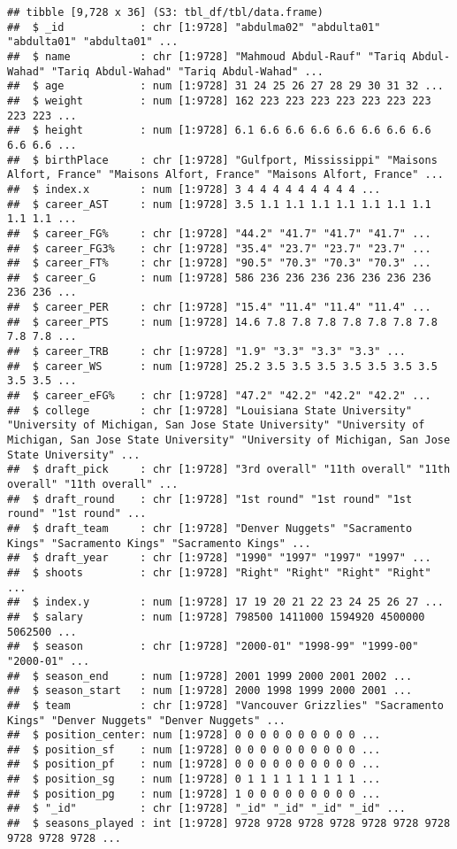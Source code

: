 \documentclass[
]{book}
\begin{document}
\begin{verbatim}
## tibble [9,728 x 36] (S3: tbl_df/tbl/data.frame)
##  $ _id            : chr [1:9728] "abdulma02" "abdulta01" "abdulta01" "abdulta01" ...
##  $ name           : chr [1:9728] "Mahmoud Abdul-Rauf" "Tariq Abdul-Wahad" "Tariq Abdul-Wahad" "Tariq Abdul-Wahad" ...
##  $ age            : num [1:9728] 31 24 25 26 27 28 29 30 31 32 ...
##  $ weight         : num [1:9728] 162 223 223 223 223 223 223 223 223 223 ...
##  $ height         : num [1:9728] 6.1 6.6 6.6 6.6 6.6 6.6 6.6 6.6 6.6 6.6 ...
##  $ birthPlace     : chr [1:9728] "Gulfport, Mississippi" "Maisons Alfort, France" "Maisons Alfort, France" "Maisons Alfort, France" ...
##  $ index.x        : num [1:9728] 3 4 4 4 4 4 4 4 4 4 ...
##  $ career_AST     : num [1:9728] 3.5 1.1 1.1 1.1 1.1 1.1 1.1 1.1 1.1 1.1 ...
##  $ career_FG%     : chr [1:9728] "44.2" "41.7" "41.7" "41.7" ...
##  $ career_FG3%    : chr [1:9728] "35.4" "23.7" "23.7" "23.7" ...
##  $ career_FT%     : chr [1:9728] "90.5" "70.3" "70.3" "70.3" ...
##  $ career_G       : num [1:9728] 586 236 236 236 236 236 236 236 236 236 ...
##  $ career_PER     : chr [1:9728] "15.4" "11.4" "11.4" "11.4" ...
##  $ career_PTS     : num [1:9728] 14.6 7.8 7.8 7.8 7.8 7.8 7.8 7.8 7.8 7.8 ...
##  $ career_TRB     : chr [1:9728] "1.9" "3.3" "3.3" "3.3" ...
##  $ career_WS      : num [1:9728] 25.2 3.5 3.5 3.5 3.5 3.5 3.5 3.5 3.5 3.5 ...
##  $ career_eFG%    : chr [1:9728] "47.2" "42.2" "42.2" "42.2" ...
##  $ college        : chr [1:9728] "Louisiana State University" "University of Michigan, San Jose State University" "University of Michigan, San Jose State University" "University of Michigan, San Jose State University" ...
##  $ draft_pick     : chr [1:9728] "3rd overall" "11th overall" "11th overall" "11th overall" ...
##  $ draft_round    : chr [1:9728] "1st round" "1st round" "1st round" "1st round" ...
##  $ draft_team     : chr [1:9728] "Denver Nuggets" "Sacramento Kings" "Sacramento Kings" "Sacramento Kings" ...
##  $ draft_year     : chr [1:9728] "1990" "1997" "1997" "1997" ...
##  $ shoots         : chr [1:9728] "Right" "Right" "Right" "Right" ...
##  $ index.y        : num [1:9728] 17 19 20 21 22 23 24 25 26 27 ...
##  $ salary         : num [1:9728] 798500 1411000 1594920 4500000 5062500 ...
##  $ season         : chr [1:9728] "2000-01" "1998-99" "1999-00" "2000-01" ...
##  $ season_end     : num [1:9728] 2001 1999 2000 2001 2002 ...
##  $ season_start   : num [1:9728] 2000 1998 1999 2000 2001 ...
##  $ team           : chr [1:9728] "Vancouver Grizzlies" "Sacramento Kings" "Denver Nuggets" "Denver Nuggets" ...
##  $ position_center: num [1:9728] 0 0 0 0 0 0 0 0 0 0 ...
##  $ position_sf    : num [1:9728] 0 0 0 0 0 0 0 0 0 0 ...
##  $ position_pf    : num [1:9728] 0 0 0 0 0 0 0 0 0 0 ...
##  $ position_sg    : num [1:9728] 0 1 1 1 1 1 1 1 1 1 ...
##  $ position_pg    : num [1:9728] 1 0 0 0 0 0 0 0 0 0 ...
##  $ "_id"          : chr [1:9728] "_id" "_id" "_id" "_id" ...
##  $ seasons_played : int [1:9728] 9728 9728 9728 9728 9728 9728 9728 9728 9728 9728 ...
\end{verbatim}
\end{document}
